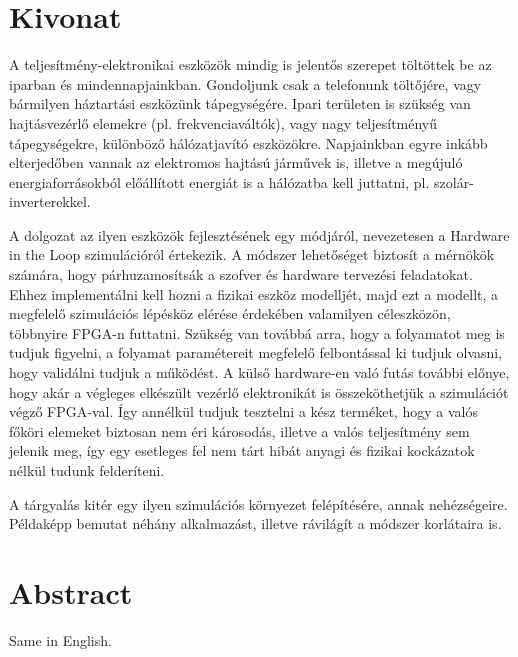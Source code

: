 \setcounter{page}{1}

\selecthungarian

\chapter*{Kivonat}

A teljesítmény-elektronikai eszközök mindig is jelentős szerepet töltöttek be az iparban és mindennapjainkban. Gondoljunk csak a telefonunk töltőjére, vagy bármilyen háztartási eszközünk tápegységére. Ipari területen is szükség van hajtásvezérlő elemekre (pl. frekvenciaváltók), vagy nagy teljesítményű tápegységekre, különböző hálózatjavító eszközökre. Napjainkban egyre inkább elterjedőben vannak az elektromos hajtású járművek is, illetve a megújuló energiaforrásokból előállított energiát is a hálózatba kell juttatni, pl. szolár-inverterekkel.

A dolgozat az ilyen eszközök fejlesztésének egy módjáról, nevezetesen a Hardware in the Loop szimulációról értekezik. A módszer lehetőséget biztosít a mérnökök számára, hogy párhuzamosítsák a szofver és hardware tervezési feladatokat. Ehhez implementálni kell hozni a fizikai eszköz modelljét, majd ezt a modellt, a megfelelő szimulációs lépésköz elérése érdekében valamilyen céleszközön, többnyire FPGA-n futtatni. Szükség van továbbá arra, hogy a folyamatot meg is tudjuk figyelni, a folyamat paramétereit megfelelő felbontással ki tudjuk olvasni, hogy validálni tudjuk a működést. A külső hardware-en való futás további előnye, hogy akár a végleges elkészült vezérlő elektronikát is összeköthetjük a szimulációt végző FPGA-val. Így annélkül tudjuk tesztelni a kész terméket, hogy a valós főköri elemeket biztosan nem éri károsodás, illetve a valós teljesítmény sem jelenik meg, így egy esetleges fel nem tárt hibát anyagi és fizikai kockázatok nélkül tudunk felderíteni.

A tárgyalás kitér egy ilyen szimulációs környezet felépítésére, annak nehézségeire. Példaképp bemutat néhány alkalmazást, illetve rávilágít a módszer korlátaira is.


\vfill
\selectenglish


\chapter*{Abstract}

Same in English.




\vfill
\selectthesislanguage

\setcounter{romanPage}{\value{page}}
